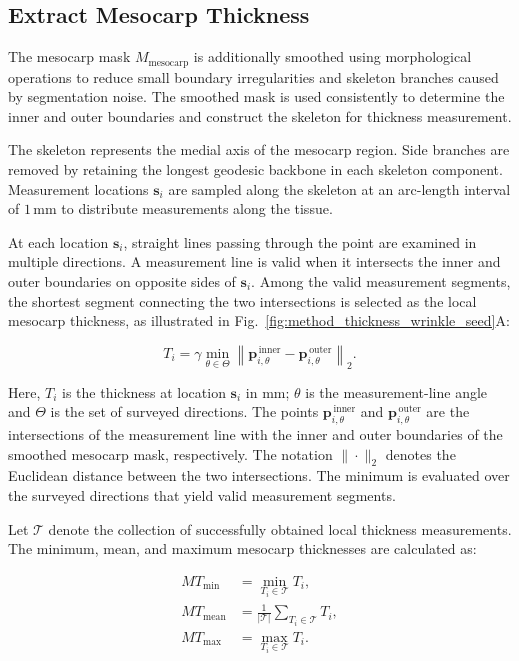\documentclass[final,5p,times,twocolumn]{elsarticle}
\begin{document}
\subsection*{Extract Mesocarp Thickness}

The mesocarp mask $M_{\mathrm{mesocarp}}$ is additionally smoothed using morphological operations to reduce small boundary irregularities and skeleton branches caused by segmentation noise. The smoothed mask is used consistently to determine the inner and outer boundaries and construct the skeleton for thickness measurement.

The skeleton represents the medial axis of the mesocarp region. Side branches are removed by retaining the longest geodesic backbone in each skeleton component. Measurement locations $\mathbf{s}_i$ are sampled along the skeleton at an arc-length interval of $1\,\mathrm{mm}$ to distribute measurements along the tissue.

At each location $\mathbf{s}_i$, straight lines passing through the point are examined in multiple directions. A measurement line is valid when it intersects the inner and outer boundaries on opposite sides of $\mathbf{s}_i$. Among the valid measurement segments, the shortest segment connecting the two intersections is selected as the local mesocarp thickness, as illustrated in Fig.~\ref{fig:method_thickness_wrinkle_seed}A:

\begin{equation}
T_i=\gamma\min_{\theta\in\Theta}\left\|\mathbf{p}^{\,\mathrm{inner}}_{i,\theta}-\mathbf{p}^{\,\mathrm{outer}}_{i,\theta}\right\|_2.
\end{equation}

Here, $T_i$ is the thickness at location $\mathbf{s}_i$ in mm; $\theta$ is the measurement-line angle and $\Theta$ is the set of surveyed directions. The points $\mathbf{p}^{\,\mathrm{inner}}_{i,\theta}$ and $\mathbf{p}^{\,\mathrm{outer}}_{i,\theta}$ are the intersections of the measurement line with the inner and outer boundaries of the smoothed mesocarp mask, respectively. The notation $\|\cdot\|_2$ denotes the Euclidean distance between the two intersections. The minimum is evaluated over the surveyed directions that yield valid measurement segments.

Let $\mathcal{T}$ denote the collection of successfully obtained local thickness measurements. The minimum, mean, and maximum mesocarp thicknesses are calculated as:

\begin{align}
MT_{\min} &= \min_{T_i\in\mathcal{T}}T_i,\\
MT_{\mathrm{mean}} &= \frac{1}{|\mathcal{T}|}\sum_{T_i\in\mathcal{T}}T_i,\\
MT_{\max} &= \max_{T_i\in\mathcal{T}}T_i.
\end{align}
\end{document}
